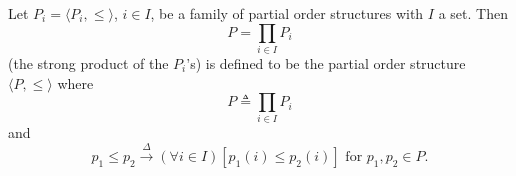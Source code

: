 Let $P_i = \langle P_i, \leq \rangle$, $i \in I$, be a family of partial order structures with $I$ a set. Then
$$P = \prod_{i \in I} P_i$$
(the strong product of the $P_i$'s) is defined to be the partial order structure $\langle P, \leq \rangle$ where
$$P \triangleq \prod_{i \in I} P_i$$
and
$$p_1 \leq p_2 \xrightarrow{\Delta} (\forall i \in I)[p_1(i) \leq p_2(i)] \text{ for } p_1, p_2 \in P.$$

